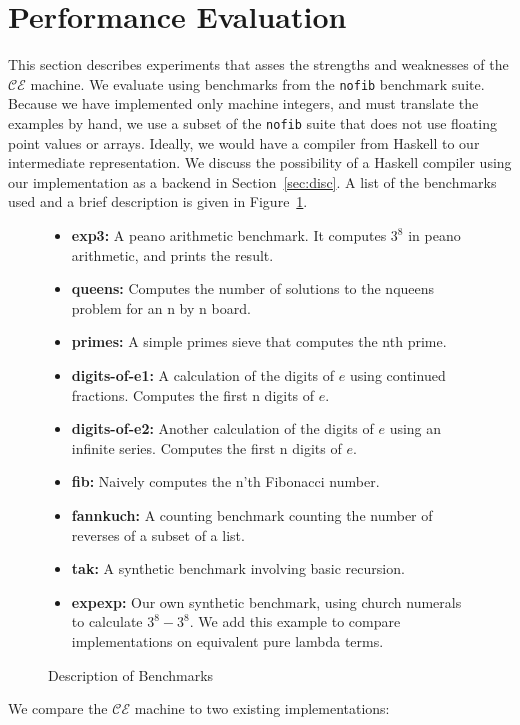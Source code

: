 \section{Performance Evaluation} \label{sec:eval}

This section describes experiments that asses the strengths and weaknesses of
the $\mathcal{CE}$ machine. We evaluate using benchmarks from the \texttt{nofib}
benchmark suite. Because we have implemented only machine integers, and must
translate the examples by hand, we use a subset of the \texttt{nofib} suite that
does not use floating point values or arrays. Ideally, we would have a compiler
from Haskell to our intermediate representation. We discuss the possibility of a
Haskell compiler using our implementation as a backend in
Section~\ref{sec:disc}. A list of the benchmarks used and a brief description is
given in Figure~\ref{fig:bench}.

\begin{figure}
\begin{itemize}
\item \textbf{exp3:} A peano arithmetic benchmark. It computes $3^8$ in
peano arithmetic, and prints the result. 
\item \textbf{queens:} Computes the number of solutions to the nqueens problem
for an n by n board.
\item \textbf{primes:} A simple primes sieve that computes the nth prime.
\item \textbf{digits-of-e1:} A calculation of the digits of $e$ using continued
fractions. Computes the first n digits of $e$.
\item \textbf{digits-of-e2:} Another calculation of the digits of $e$ using an
infinite series. Computes the first n digits of $e$. 
\item \textbf{fib:} Naively computes the n'th Fibonacci number.
\item \textbf{fannkuch:} A counting benchmark counting the number of reverses of
a subset of a list.
\item \textbf{tak:} A synthetic benchmark involving basic recursion.
\item \textbf{expexp:} Our own synthetic benchmark, using church numerals to
calculate $3^8-3^8$. We add this example to compare implementations on
equivalent pure lambda terms.
\end{itemize}
\caption{Description of Benchmarks}
\label{fig:bench}
\end{figure}

We compare the $\mathcal{CE}$ machine to two existing implementations:

